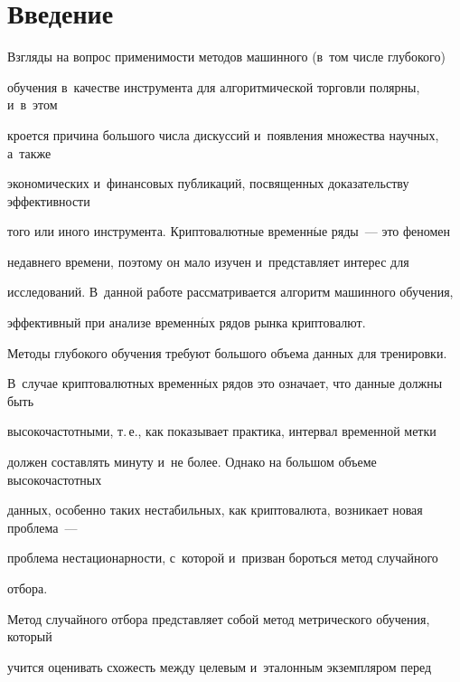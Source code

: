       

      \vspace*{-18pt} 



\section{Введение}



\vspace*{-2pt}



Взгляды на вопрос применимости методов машинного (в~том числе глубокого) 

обучения в~качестве инструмента для алгоритмической торговли полярны, и~в~этом 

кроется причина большого числа дискуссий и~появления множества научных, а~также 

экономических и~финансовых публикаций, посвященных доказательству эффективности 

того или иного инструмента. Криптовалютные временн$\acute{\mbox{ы}}$е ряды~--- это феномен 

недавнего времени, поэтому он мало изучен и~представляет интерес для 

исследований. В~данной работе рас\-смат\-ри\-ва\-ет\-ся алгоритм машинного обучения, 

эффективный при анализе временн$\acute{\mbox{ы}}$х рядов рынка криптовалют.



Методы глубокого обучения требуют большого объема данных для тренировки. 

В~случае криптовалютных временн$\acute{\mbox{ы}}$х рядов это означает, что данные долж\-ны быть 

высокочастотными, т.\,е., как показывает практика, интервал временной метки 

должен со\-став\-лять минуту и~не более. Однако на большом объеме высокочастотных 

данных, особенно таких нестабильных, как криптовалюта, возникает новая проб\-ле\-ма~--- 

проблема нестационарности, с~которой и~призван бороться метод случайного 

отбора.



Метод случайного отбора представляет собой метод метрического обучения, который 

учится оценивать схожесть между целевым и~эталонным экземпляром перед 

